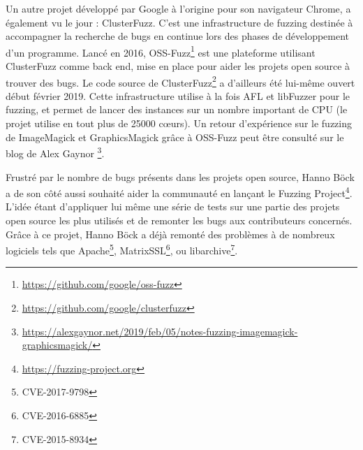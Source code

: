 Un autre projet développé par Google à l'origine pour son navigateur Chrome,
a également vu le jour : ClusterFuzz.
C'est une infrastructure de fuzzing destinée à accompagner la recherche de
bugs en continue lors des phases de développement d'un programme.
Lancé en 2016, OSS-Fuzz\footnote{\url{https://github.com/google/oss-fuzz}}
est une plateforme utilisant ClusterFuzz comme back end, mise en place pour
aider les projets open source à trouver des bugs. Le code source de
ClusterFuzz\footnote{\url{https://github.com/google/clusterfuzz}}
a d'ailleurs été lui-même ouvert début février 2019.
Cette infrastructure utilise à la fois AFL et libFuzzer pour le fuzzing,
et permet de lancer des instances sur un nombre important de CPU (le projet
utilise en tout plus de 25000 cœurs).
Un retour d'expérience sur le fuzzing de ImageMagick et GraphicsMagick grâce à OSS-Fuzz
peut être consulté sur le blog de Alex Gaynor
\footnote{\url{https://alexgaynor.net/2019/feb/05/notes-fuzzing-imagemagick-graphicsmagick/}}.

Frustré par le nombre de bugs présents dans les projets open source, Hanno
Böck a de son côté aussi souhaité aider la communauté en lançant
le Fuzzing Project\footnote{\url{https://fuzzing-project.org}}. L'idée étant
d'appliquer lui même une série de tests sur une partie des projets open
source les plus utilisés et de remonter les bugs aux contributeurs concernés.
Grâce à ce projet, Hanno Böck a déjà remonté des problèmes à de nombreux
logiciels tels que Apache\footnote{CVE-2017-9798}, MatrixSSL\footnote{CVE-2016-6885},
ou libarchive\footnote{CVE-2015-8934}.
